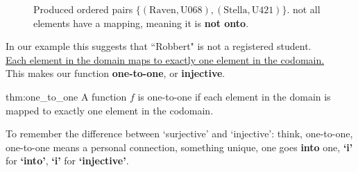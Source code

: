\begin{figure}[ht]
    \centering
    \caption{\centering Produced ordered pairs $\{(\text{Raven},\text{U068}),(\text{Stella},\text{U421})\}$.
        not all elements have a mapping, meaning it is \textbf{not onto}.}
    \label{fig:cats_dogs}
\end{figure}

\noindent
In our example this suggests that ``Robbert" is not a registered student.\\

\noindent
\underline{Each element in the domain maps to exactly one element in the codomain.}\\
This makes our function \textbf{one-to-one}, or \textbf{injective}.\\

\begin{Def}{thm:one_to_one}
    A function $f$ is one-to-one if each element in the domain is mapped to exactly one element in the codomain.
\end{Def}

\begin{Tip}
    To remember the difference between `surjective' and `injective': think, one-to-one,
    one-to-one means a personal connection, something unique, one goes \textbf{into} one, \textbf{`i'}
    for \textbf{`into'}, \textbf{`i'} for \textbf{`injective'}.\\

\end{Tip}

